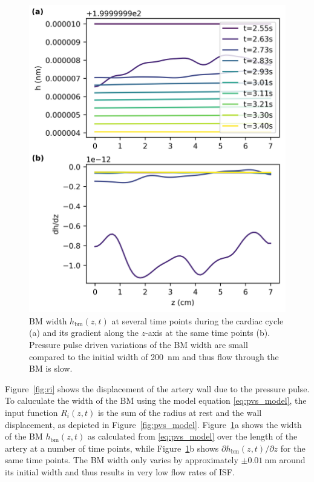 \documentclass[a4paper,titlepage]{scrartcl}
\begin{document}
\begin{figure}
\centerline{\includegraphics{figures/h_dh.png}}
\caption{BM width $h_\textrm{bm}(z,t)$ at several time points during the cardiac cycle (a) and its gradient along the $z$-axis at the same time points (b). Pressure pulse driven variations of the BM width are small compared to the initial width of \SI{200}{\nano\metre} and thus flow through the BM is slow.\label{fig:h}}
\end{figure}

Figure~\ref{fig:ri} shows the displacement of the artery wall due to the pressure pulse. To caluculate the width of the BM using the model equation \eqref{eq:pvs_model}, the input function $R_i(z,t)$ is the sum of the radius at rest and the wall displacement, as depicted in Figure~\ref{fig:pvs_model}. Figure~\ref{fig:h}a shows the width of the BM $h_\textrm{bm}(z,t)$ as calculated from \eqref{eq:pvs_model} over the length of the artery at a number of time points, while Figure~\ref{fig:h}b shows $\partial h_\textrm{bm}(z,t)/ \partial z$ for the same time points. The BM width only varies by approximately $\pm \SI{0.01}{\nano\metre}$ around its initial width and thus results in very low flow rates of ISF.
\end{document}
